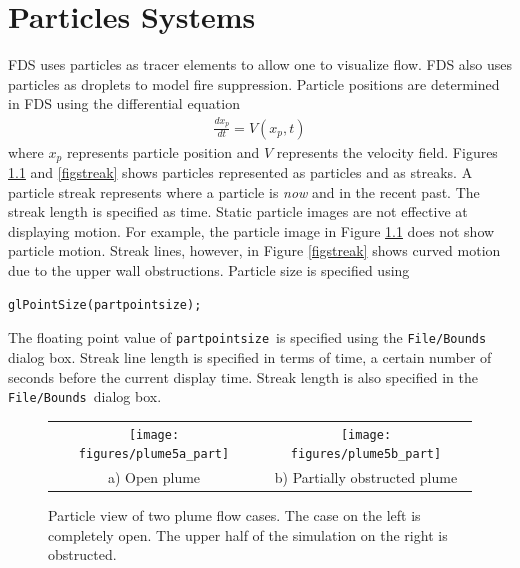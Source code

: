 \documentclass[11pt,twoside]{book}
\newcommand{\figoptions}{htp}
\begin{document}
\chapter{Particles Systems}
FDS uses particles as tracer elements to allow one to visualize flow.  FDS
also uses particles as droplets to model fire suppression.  Particle positions are determined in FDS using the differential equation
\begin{eqnarray*}
\frac{dx_p}{dt}=V(x_p,t)
\end{eqnarray*}
where $x_p$ represents particle position and $V$ represents the velocity field.  Figures \ref{figpart} and \ref{figstreak}
shows particles represented as particles and
as streaks.
A particle streak represents where a particle is {\em now} and in the recent past.  The streak length is specified as time.
Static particle images are not effective at displaying motion.  For example, the particle image in Figure \ref{figpart} does not show particle motion.  Streak lines, however, in Figure \ref{figstreak} shows curved motion due to the upper wall obstructions.
Particle size is
specified using
\begin{verbatim}
glPointSize(partpointsize);
\end{verbatim}
The floating point value of {\tt partpointsize}\ is specified using the {\tt File/Bounds}
dialog box.  Streak line length is specified in terms of time, a certain number of seconds before the current display time.  Streak length is also specified in the {\tt File/Bounds}\ dialog box.

\begin{figure}[\figoptions]
\begin{center}
\begin{tabular}{cc}
\texttt{[image: figures/plume5a\_part]}&
\texttt{[image: figures/plume5b\_part]}\\
a) Open plume&b) Partially obstructed plume\\
\end{tabular}
\end{center}
\caption[Particle view of two plume flow cases.]
{Particle view of two plume flow cases.  The case on the left
is completely open.  The upper half of the simulation on the right is obstructed.
  }
\label{figpart}%
\end{figure}
\end{document}
